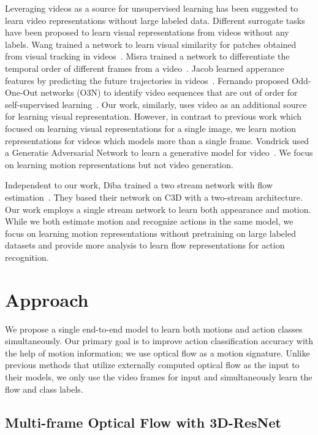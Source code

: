 \documentclass[10pt,twocolumn,letterpaper]{article}
\begin{document}
Leveraging videos as a source for unsupervised learning has been suggested to learn video representations without large labeled data.
Different surrogate tasks have been proposed to learn visual representations from videos without any labels.
Wang \etal trained a network to learn visual similarity for patches obtained from visual tracking in videos~\cite{wang2015unsupervised}.
Misra \etal trained a network to differentiate the temporal order of different frames from a video~\cite{misra2016shuffle}.
Jacob \etal learned apperance features by predicting the future trajectories in videos~\cite{walker2016uncertain}.
Fernando \etal proposed Odd-One-Out networks (O3N) to identify video sequences that are out of order for self-supervised learning~\cite{fernando2016self}.
Our work, similarly, uses video as an additional source for learning visual representation.
However, in contrast to previous work which focused on learning visual representations for a single image, we learn motion representations for videos which models more than a single frame.
Vondrick \etal used a Generatie Adversarial Network to learn a generative model for video~\cite{vondrick2016generating}.
We focus on learning motion representations but not video generation.

Independent to our work, Diba \etal trained a two stream network with flow estimation~\cite{diba2016efficient}.
They based their network on C3D with a two-stream architecture.
Our work employs a single stream network to learn both appearance and motion.
While we both estimate motion and recognize actions in the same model, we focus on learning motion representations without pretraining on large labeled datasets and provide more analysis to learn flow representations for action recognition.
 

\section{Approach}
\label{sec:approach}

We propose a single end-to-end model to learn both motions and action classes simultaneously.
Our primary goal is to improve action classification accuracy with the help of motion information; we use optical flow as a motion signature.
Unlike previous methods that utilize externally computed optical flow as the input to their models, we only use the video frames for input and simultaneously learn the flow and class labels.


\subsection{Multi-frame Optical Flow with 3D-ResNet}
\end{document}
